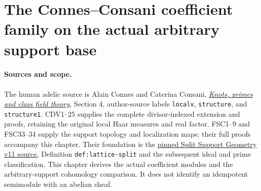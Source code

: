 \documentclass[11pt,a4paper]{article}
\theoremstyle{definition}\newtheorem{definition}[theorem]{Definition}
\begin{document}
\section{The Connes--Consani coefficient family on the actual arbitrary support base}
\label{sec:arbitrary-support-cc}

\paragraph{Sources and scope.}
The human adelic source is Alain Connes and Caterina Consani,
\href{https://arxiv.org/abs/2501.06560v1}{\emph{Knots, primes and class
field theory}}, Section 4, author-source labels \texttt{localv},
\texttt{structure}, and \texttt{structure1}. CDV1--25 supplies the
complete divisor-indexed extension and proofs, retaining the original
local Haar measures and real factor. FSC1--9 and FSC33--34 supply the
support topology and localization maps; their full proofs accompany
this chapter. Their foundation is the
\href{https://github.com/KokunoYumeto/zeta-function-research-reader/blob/a2851f9eb352e7e4376bc629de86fa4ed9c1c434/workbenches/splitzero-tandem/foundations/split-support-geometry-v11/split_support_geometry_arithmetic_curve_v11.tex}{pinned Split Support Geometry v11 source},
Definition \texttt{def:lattice-split} and the subsequent ideal and prime
classification. This chapter derives the actual coefficient modules
and the arbitrary-support cohomology comparison. It does not identify
an idempotent semimodule with an abelian sheaf.
\end{document}
